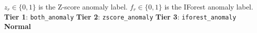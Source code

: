   \begin{algorithm}[H]
      \small                                                                                                                                              
      \caption{$\texttt{tier}_r \gets
      \texttt{SignalFusion}(z_r,\; f_r)$}
      \label{alg:fusion}                                                                                                                                  
      \begin{algorithmic}[1]
          \Require $z_r \in \{0, 1\}$ is the Z-score anomaly label.                                                                                       
          \Require $f_r \in \{0, 1\}$ is the IForest anomaly label.                                                                                       
              \State \Return \textbf{Tier 1}: \texttt{both\_anomaly}                                                                                      
              \State \Return \textbf{Tier 2}: \texttt{zscore\_anomaly}                                                                                    
              \State \Return \textbf{Tier 3}: \texttt{iforest\_anomaly}                                                                                   
          \Else
              \State \Return \textbf{Normal}                                                                                                              
          \EndIf                                                                                                                                          
      \end{algorithmic}
  \end{algorithm}                                                                                                                                         
                  
